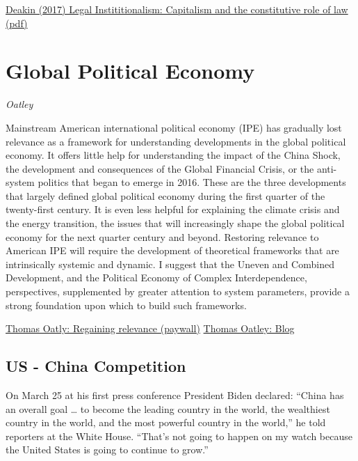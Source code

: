 \documentclass[
]{book}
\begin{document}
\href{https://www.sciencedirect.com/science/article/pii/S0147596716300087}{Deakin (2017) Legal Instititionalism: Capitalism and the constitutive role of law}
\href{pdf/Deakin_2017_Capitalism_and_Law.pdf}{(pdf)}

\hypertarget{global-political-economy}{%
\chapter{Global Political Economy}\label{global-political-economy}}

\emph{Oatley}

Mainstream American international political economy (IPE) has gradually lost relevance as a framework for understanding developments in the global political economy. It offers little help for understanding the impact of the China Shock, the development and consequences of the Global Financial Crisis, or the anti-system politics that began to emerge in 2016. These are the three developments that largely defined global political economy during the first quarter of the twenty-first century. It is even less helpful for explaining the climate crisis and the energy transition, the issues that will increasingly shape the global political economy for the next quarter century and beyond. Restoring relevance to American IPE will require the development of theoretical frameworks that are intrinsically systemic and dynamic. I suggest that the Uneven and Combined Development, and the Political Economy of Complex Interdependence, perspectives, supplemented by greater attention to system parameters, provide a strong foundation upon which to build such frameworks.

\href{https://www.tandfonline.com/doi/abs/10.1080/09557571.2021.1888880?journalCode=ccam20}{Thomas Oatly: Regaining relevance (paywall)}
\href{https://www.thomasoatley.org/blog/}{Thomas Oatley: Blog}

\hypertarget{us---china-competition}{%
\section{US - China Competition}\label{us---china-competition}}

On March 25 at his first press conference President Biden declared: ``China has an overall goal \ldots{} to become the leading country in the world, the wealthiest country in the world, and the most powerful country in the world,'' he told reporters at the White House. ``That's not going to happen on my watch because the United States is going to continue to grow.''
\end{document}
